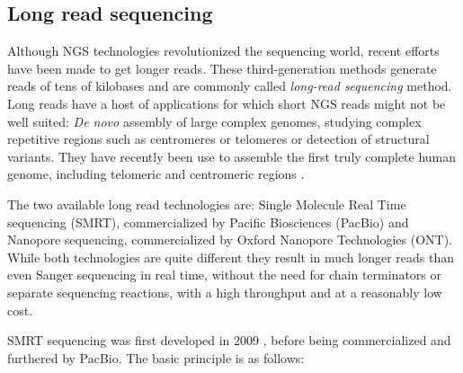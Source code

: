 \documentclass[
  11pt,
  twoside]{scrbook}
\begin{document}
\hypertarget{long-read-sequencing}{%
\subsection{Long read sequencing}\label{long-read-sequencing}}

Although NGS technologies revolutionized the sequencing world, recent efforts have been made to get longer reads. These third-generation methods generate reads of tens of kilobases and are commonly called \emph{long-read sequencing} method. Long reads have a host of applications \autocite{pollardLongReadsTheir2018} for which short NGS reads might not be well suited: \emph{De novo} assembly of large complex genomes, studying complex repetitive regions such as centromeres or telomeres or detection of structural variants. They have recently been use to assemble the first truly complete human genome, including telomeric and centromeric regions \autocite{nurk2022}.

The two available long read technologies are: Single Molecule Real Time sequencing (SMRT), commercialized by Pacific Biosciences (PacBio) and Nanopore sequencing, commercialized by Oxford Nanopore Technologies (ONT). While both technologies are quite different they result in much longer reads than even Sanger sequencing in real time, without the need for chain terminators or separate sequencing reactions, with a high throughput and at a reasonably low cost.

SMRT sequencing was first developed in 2009 \autocite{eidRealTimeDNASequencing2009}, before being commercialized and furthered by PacBio. The basic principle is as follows:
\end{document}
